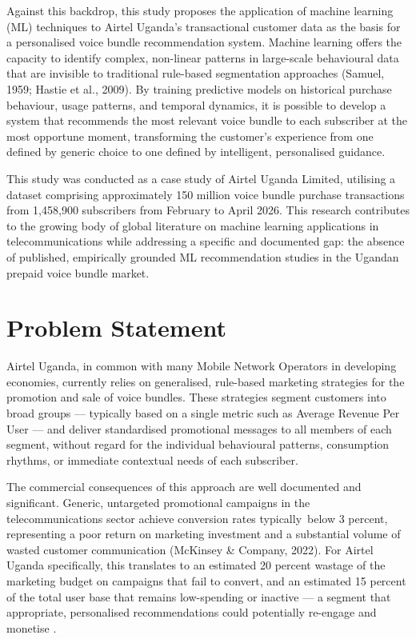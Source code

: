Against this backdrop, this study proposes the application of machine learning (ML) techniques to Airtel Uganda's transactional customer data as the basis for a personalised voice bundle recommendation system. Machine learning offers the capacity to identify complex, non-linear patterns in large-scale behavioural data that are invisible to traditional rule-based segmentation approaches (Samuel, 1959; Hastie et al., 2009). By training predictive models on historical purchase behaviour, usage patterns, and temporal dynamics, it is possible to develop a system that recommends the most relevant voice bundle to each subscriber at the most opportune moment, transforming the customer's experience from one defined by generic choice to one defined by intelligent, personalised guidance.

This study was conducted as a case study of Airtel Uganda Limited, utilising a dataset comprising approximately 150 million voice bundle purchase transactions from 1,458,900 subscribers from February to April 2026. This research contributes to the growing body of global literature on machine learning applications in telecommunications while addressing a specific and documented gap: the absence of published, empirically grounded ML recommendation studies in the Ugandan prepaid voice bundle market.


\section{Problem Statement}

Airtel Uganda, in common with many Mobile Network Operators in developing economies, currently relies on generalised, rule-based marketing strategies for the promotion and sale of voice bundles. These strategies segment customers into broad groups --- typically based on a single metric such as Average Revenue Per User --- and deliver standardised promotional messages to all members of each segment, without regard for the individual behavioural patterns, consumption rhythms, or immediate contextual needs of each subscriber.

The commercial consequences of this approach are well documented and significant. Generic, untargeted promotional campaigns in the telecommunications sector achieve conversion rates typically below 3 percent, representing a poor return on marketing investment and a substantial volume of wasted customer communication (McKinsey \& Company, 2022). For Airtel Uganda specifically, this translates to an estimated 20 percent wastage of the marketing budget on campaigns that fail to convert, and an estimated 15 percent of the total user base that remains low-spending or inactive --- a segment that appropriate, personalised recommendations could potentially re-engage and monetise \cite{ref31}.

